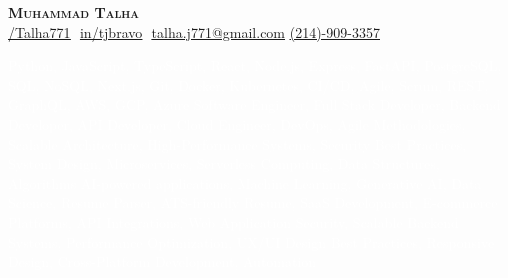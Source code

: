 \documentclass[letterpaper,11pt]{article}
\begin{document}
\begin{flushright}
  \color{gray}
  \item
\end{flushright}

\vspace{-10pt}

\begin{center}
    \textbf{\Huge \scshape Muhammad Talha} \\ \vspace{8pt}
    \small 
    \href{https://github.com/Talha771}
    {\underline{/Talha771}} $  $
    \href{https://linkedin.com/in/tjbravo}{\underline{in/tjbravo}} $  $
    \href{mailto:talha.j771@gmail.com}
    {\underline{talha.j771@gmail.com}}
    \href{tel:0021490093357}{\underline{(214)-909-3357}}
\end{center}



   


\hspace{0pt}\textcolor{white}{Python, JavaScript, TypeScript, React, Node.js, Express, FastAPI, PostgreSQL, SQL, NoSQL, Next.js, Git, Docker, Kubernetes, CI/CD, Agile, Scrum, REST, GraphQL, AWS, GCP, Azure}
\hspace{0pt}\textcolor{white}{Software Engineer, Full Stack Developer, Backend Developer, API Developer, Cloud Engineer, DevOps, Agile Methodologies, Scalable Architecture, High-Performance Systems, Security Best Practices, System Design, Microservices, Serverless Computing, Data Structures, Algorithms}
\hspace{0pt}\textcolor{white}{AI-powered applications, Machine Learning, Generative AI, Data Science, Resume Parser, ATS-friendly Resume, SaaS Development, E-commerce Platforms, API Integrations, Web Application Security, Scalable Backend Systems, Performance Optimization, UX/UI Design Best Practices, Responsive Design, Cross-Platform Development, Automation}
\end{document}

